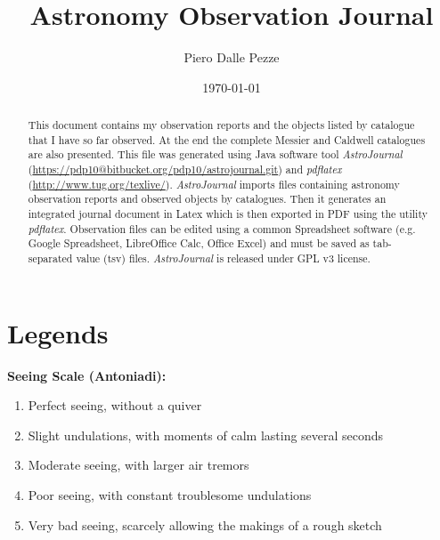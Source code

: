 \documentclass[10pt,twoside,a4paper,english]{article}
\title{Astronomy Observation Journal}
\author{Piero Dalle Pezze}
\date{\today}
\begin{document}
\maketitle

\begin{abstract}
This document contains my observation reports and the objects listed by catalogue that I have so far observed. At the end the complete Messier and Caldwell catalogues are also presented. This file was generated using Java software tool {\it AstroJournal} (\href{https://pdp10@bitbucket.org/pdp10/astrojournal.git}{https://pdp10@bitbucket.org/pdp10/astrojournal.git}) and {\it pdflatex} (\href{http://www.tug.org/texlive/}{http://www.tug.org/texlive/}). {\it AstroJournal} imports files containing astronomy observation reports and observed objects by catalogues. Then it generates an integrated journal document in Latex which is then exported in PDF using the utility {\it pdflatex}. Observation files can be edited using a common Spreadsheet software (e.g. Google Spreadsheet, LibreOffice Calc, Office Excel) and must be saved as tab-separated value (tsv) files. {\it AstroJournal} is released under GPL v3 license.
\end{abstract}

\tableofcontents

\newpage


\small


\section{Legends}

\noindent 

\bigskip 
{\bf Seeing Scale (Antoniadi):}
\begin{enumerate}
\item Perfect seeing, without a quiver
\item Slight undulations, with moments of calm lasting several seconds
\item Moderate seeing, with larger air tremors
\item Poor seeing, with constant troublesome undulations
\item Very bad seeing, scarcely allowing the makings of a rough sketch
\end{enumerate}
\end{document}

